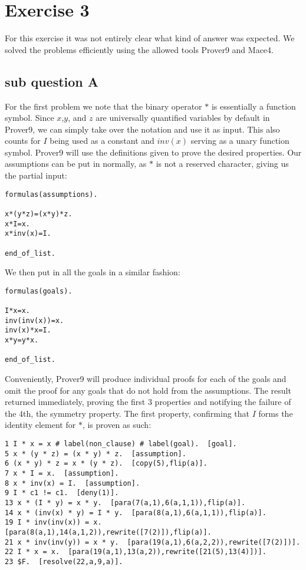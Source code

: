 \chapter{Exercise 3}
For this exercise it was not entirely clear what kind of answer was expected. We solved the problems efficiently using the allowed tools Prover9 and Mace4.

\section{sub question A}
For the first problem we note that the binary operator $*$ is essentially a function symbol. Since $x$,$y$, and $z$ are universally quantified variables by default in Prover9, we can simply take over the notation and use it as input. This also counts for $I$ being used as a constant and $inv(x)$ serving as a unary function symbol. Prover9 will use the definitions given to prove the desired properties. Our assumptions can be put in normally, as $*$ is not a reserved character, giving us the partial input:\\
\begin{verbatim}
formulas(assumptions).

x*(y*z)=(x*y)*z.
x*I=x.
x*inv(x)=I.

end_of_list.
\end{verbatim}
We then put in all the goals in a similar fashion:\\
\begin{verbatim}
formulas(goals).

I*x=x.
inv(inv(x))=x.
inv(x)*x=I.
x*y=y*x.

end_of_list.
\end{verbatim}
Conveniently, Prover9 will produce individual proofs for each of the goals and omit the proof for any goals that do not hold from the assumptions. The result returned immediately, proving the first $3$ properties and notifying the failure of the $4$th, the symmetry property. The first property, confirming that $I$ forms the identity element for $*$, is proven as such:\\
\begin{verbatim}
1 I * x = x # label(non_clause) # label(goal).  [goal].
5 x * (y * z) = (x * y) * z.  [assumption].
6 (x * y) * z = x * (y * z).  [copy(5),flip(a)].
7 x * I = x.  [assumption].
8 x * inv(x) = I.  [assumption].
9 I * c1 != c1.  [deny(1)].
13 x * (I * y) = x * y.  [para(7(a,1),6(a,1,1)),flip(a)].
14 x * (inv(x) * y) = I * y.  [para(8(a,1),6(a,1,1)),flip(a)].
19 I * inv(inv(x)) = x.  [para(8(a,1),14(a,1,2)),rewrite([7(2)]),flip(a)].
21 x * inv(inv(y)) = x * y.  [para(19(a,1),6(a,2,2)),rewrite([7(2)])].
22 I * x = x.  [para(19(a,1),13(a,2)),rewrite([21(5),13(4)])].
23 $F.  [resolve(22,a,9,a)].
\end{verbatim}
